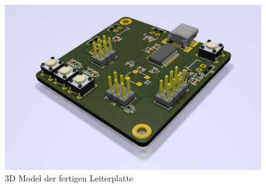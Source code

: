 

\begin{figure}[ht]
    \begin{center}
      \includegraphics[width=12cm]{assets/images/board_3d}
    \end{center}
    \vspace{-3ex}
    \caption{3D Model der fertigen Leiterplatte}
    \label{fig:3d_board}
  \end{figure}